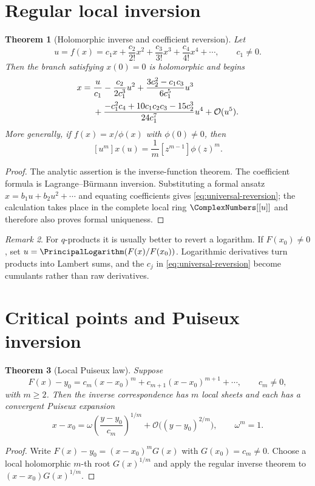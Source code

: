 \documentclass[11pt,oneside]{book}
\newtheorem{theorem}{Theorem}[chapter]
\theoremstyle{definition}
\theoremstyle{remark}
\newtheorem{remark}[theorem]{Remark}
\newcommand{\OO}{\mathcal{O}}
\begin{document}
\section{Regular local inversion}
\begin{theorem}[Holomorphic inverse and coefficient reversion]\label{thm:regular-inverse}
Let
\[
 u=f(x)=c_1x+\frac{c_2}{2!}x^2+\frac{c_3}{3!}x^3
       +\frac{c_4}{4!}x^4+\cdots,
 \qquad c_1\ne0.
\]
Then the branch satisfying $x(0)=0$ is holomorphic and begins
\begin{align}
 x={}&\frac{u}{c_1}-\frac{c_2}{2c_1^3}u^2
 +\frac{3c_2^2-c_1c_3}{6c_1^5}u^3 \notag\\
 &+\frac{-c_1^2c_4+10c_1c_2c_3-15c_2^3}
 {24c_1^7}u^4+\OO(u^5).\label{eq:universal-reversion}
\end{align}
More generally, if $f(x)=x/\phi(x)$ with $\phi(0)\ne0$, then
\[
 [u^m]x(u)=\frac1m[z^{m-1}]\phi(z)^m.
\]
\end{theorem}
\begin{proof}
The analytic assertion is the inverse-function theorem.  The coefficient
formula is Lagrange--B\"urmann inversion.  Substituting a formal ansatz
$x=b_1u+b_2u^2+\cdots$ and equating coefficients gives
\eqref{eq:universal-reversion}; the calculation takes place in the complete
local ring $\ComplexNumbers[[u]]$ and therefore also proves formal uniqueness.
\end{proof}

\begin{remark}
For $q$-products it is usually better to revert a logarithm.  If $F(x_0)\ne0$,
set $u=\PrincipalLogarithm(F(x)/F(x_0))$.  Logarithmic derivatives turn products into Lambert
sums, and the $c_j$ in \eqref{eq:universal-reversion} become cumulants rather
than raw derivatives.
\end{remark}

\section{Critical points and Puiseux inversion}
\begin{theorem}[Local Puiseux law]\label{thm:puiseux}
Suppose
\[
 F(x)-y_0=c_m(x-x_0)^m+c_{m+1}(x-x_0)^{m+1}+\cdots,
 \qquad c_m\ne0,
\]
with $m\ge2$.  Then the inverse correspondence has $m$ local sheets and each
has a convergent Puiseux expansion
\[
 x-x_0=\omega\left(\frac{y-y_0}{c_m}\right)^{1/m}
 +\OO\bigl((y-y_0)^{2/m}\bigr),\qquad \omega^m=1.
\]
\end{theorem}
\begin{proof}
Write $F(x)-y_0=(x-x_0)^mG(x)$ with $G(x_0)=c_m\ne0$.  Choose a local
holomorphic $m$-th root $G(x)^{1/m}$ and apply the regular inverse theorem to
$(x-x_0)G(x)^{1/m}$.
\end{proof}
\end{document}
